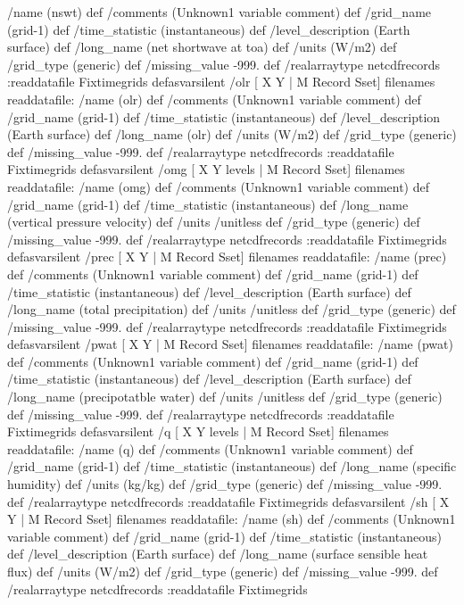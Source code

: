 \begin{ingrid}
{/name (nswt) def
 /comments (Unknown1 variable comment) def
 /grid_name (grid-1) def
 /time_statistic (instantaneous) def
 /level_description (Earth surface) def
 /long_name (net shortwave at toa) def
 /units (W/m2) def
 /grid_type (generic) def
 /missing_value -999. def
 /realarraytype netcdfrecords :readdatafile Fixtimegrids
}defasvarsilent
 /olr{
[ X Y | M Record Sset] filenames readdatafile:
/name (olr) def
 /comments (Unknown1 variable comment) def
 /grid_name (grid-1) def
 /time_statistic (instantaneous) def
 /level_description (Earth surface) def
 /long_name (olr) def
 /units (W/m2) def
 /grid_type (generic) def
 /missing_value -999. def
 /realarraytype netcdfrecords :readdatafile Fixtimegrids
}defasvarsilent
 /omg{
[ X Y levels | M Record Sset] filenames readdatafile:
/name (omg) def
 /comments (Unknown1 variable comment) def
 /grid_name (grid-1) def
 /time_statistic (instantaneous) def
 /long_name (vertical pressure velocity) def
 /units /unitless def
 /grid_type (generic) def
 /missing_value -999. def
 /realarraytype netcdfrecords :readdatafile Fixtimegrids
}defasvarsilent
 /prec{
[ X Y | M Record Sset] filenames readdatafile:
/name (prec) def
 /comments (Unknown1 variable comment) def
 /grid_name (grid-1) def
 /time_statistic (instantaneous) def
 /level_description (Earth surface) def
 /long_name (total precipitation) def
 /units /unitless def
 /grid_type (generic) def
 /missing_value -999. def
 /realarraytype netcdfrecords :readdatafile Fixtimegrids
}defasvarsilent
 /pwat{
[ X Y | M Record Sset] filenames readdatafile:
/name (pwat) def
 /comments (Unknown1 variable comment) def
 /grid_name (grid-1) def
 /time_statistic (instantaneous) def
 /level_description (Earth surface) def
 /long_name (precipotatble water) def
 /units /unitless def
 /grid_type (generic) def
 /missing_value -999. def
 /realarraytype netcdfrecords :readdatafile Fixtimegrids
}defasvarsilent
 /q{
[ X Y levels | M Record Sset] filenames readdatafile:
/name (q) def
 /comments (Unknown1 variable comment) def
 /grid_name (grid-1) def
 /time_statistic (instantaneous) def
 /long_name (specific humidity) def
 /units (kg/kg) def
 /grid_type (generic) def
 /missing_value -999. def
 /realarraytype netcdfrecords :readdatafile Fixtimegrids
}defasvarsilent
 /sh{
[ X Y | M Record Sset] filenames readdatafile:
/name (sh) def
 /comments (Unknown1 variable comment) def
 /grid_name (grid-1) def
 /time_statistic (instantaneous) def
 /level_description (Earth surface) def
 /long_name (surface sensible heat flux) def
 /units (W/m2) def
 /grid_type (generic) def
 /missing_value -999. def
 /realarraytype netcdfrecords :readdatafile Fixtimegrids
}
\end{ingrid}
